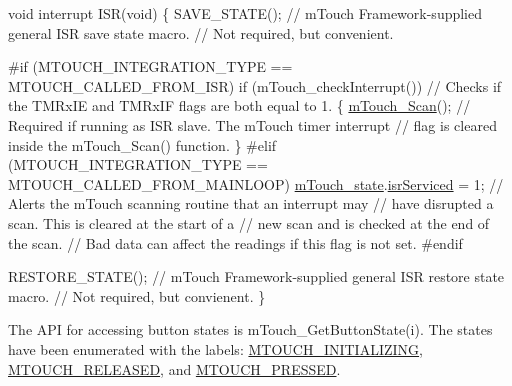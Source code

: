 \begin{DoxyCode}
\textcolor{keywordtype}{void} interrupt ISR(\textcolor{keywordtype}{void})
\{
    SAVE\_STATE();                       \textcolor{comment}{// mTouch Framework-supplied general ISR save state macro. }
                                        \textcolor{comment}{// Not required, but convenient. }

\textcolor{preprocessor}{    #if (MTOUCH\_INTEGRATION\_TYPE == MTOUCH\_CALLED\_FROM\_ISR)}
        \textcolor{keywordflow}{if} (mTouch\_checkInterrupt())    \textcolor{comment}{// Checks if the TMRxIE and TMRxIF flags are both equal to 1.}
        \{
            \hyperlink{group___acquisition_gaeeee5d5e14eaff7df78e9ad5d7ac9769}{mTouch\_Scan}();              \textcolor{comment}{// Required if running as ISR slave. The mTouch timer
       interrupt }
                                        \textcolor{comment}{// flag is cleared inside the mTouch\_Scan() function.}
        \}
\textcolor{preprocessor}{    #elif (MTOUCH\_INTEGRATION\_TYPE == MTOUCH\_CALLED\_FROM\_MAINLOOP)}
        \hyperlink{m_touch_8c_ab678fb469a6bdd3d0b75cc4b48adf504}{mTouch\_state}.\hyperlink{structm_touch___state_a98199bfb33a755cb711b9119e571bd7d}{isrServiced} = 1;   \textcolor{comment}{// Alerts the mTouch scanning routine that
       an interrupt may }
                                        \textcolor{comment}{// have disrupted a scan. This is cleared at the start of a}
                                        \textcolor{comment}{// new scan and is checked at the end of the scan.}
                                        \textcolor{comment}{// Bad data can affect the readings if this flag is not set.}
\textcolor{preprocessor}{    #endif}
    
    
    RESTORE\_STATE();                    \textcolor{comment}{// mTouch Framework-supplied general ISR restore state macro. }
                                        \textcolor{comment}{// Not required, but convienent.}
\}
\end{DoxyCode}


The A\+P\+I for accessing button states is m\+Touch\+\_\+\+Get\+Button\+State(i). The states have been enumerated with the labels\+: \hyperlink{m_touch_cap_2_p_i_c12_f_01_p_i_c16_f_01_library_2m_touch_8h_a7d72b112c35bc51408030eb7ecdcacd2a8ac4e988fd74c22ff6e99ee854cc848f}{M\+T\+O\+U\+C\+H\+\_\+\+I\+N\+I\+T\+I\+A\+L\+I\+Z\+I\+N\+G}, \hyperlink{m_touch_cap_2_p_i_c12_f_01_p_i_c16_f_01_library_2m_touch_8h_a7d72b112c35bc51408030eb7ecdcacd2a9171b63f68c2e5ed308f9700e824cbbe}{M\+T\+O\+U\+C\+H\+\_\+\+R\+E\+L\+E\+A\+S\+E\+D}, and \hyperlink{m_touch_cap_2_p_i_c12_f_01_p_i_c16_f_01_library_2m_touch_8h_a7d72b112c35bc51408030eb7ecdcacd2aed5b3f2b7065991010f45eb04759ef01}{M\+T\+O\+U\+C\+H\+\_\+\+P\+R\+E\+S\+S\+E\+D}.


